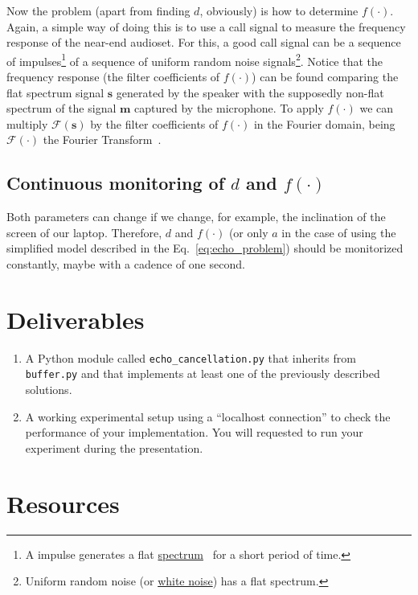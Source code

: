 Now the problem (apart from finding $d$, obviously) is how to
determine $f(\cdot)$. Again, a simple way of doing this is to use a
call signal to measure the frequency response of the near-end
audioset. For this, a good call signal can be a sequence of
impulses\footnote{A impulse generates a flat
  \href{https://en.wikipedia.org/wiki/Spectral_density}{spectrum}~\cite{kovacevic2013fourier,Oppenheim2}
  for a short period of time.} of a sequence of uniform random noise
signals\footnote{Uniform random noise (or
  \href{https://en.wikipedia.org/wiki/White_noise}{white noise}) has a
  flat spectrum.}. Notice that the frequency response (the filter
coefficients of $f(\cdot)$) can be found comparing the flat spectrum
signal ${\mathbf s}$ generated by the speaker with the supposedly
non-flat spectrum of the signal ${\mathbf m}$ captured by the
microphone. To apply $f(\cdot)$ we can multiply
${\mathcal F}({\mathbf s})$ by the filter coefficients of $f(\cdot)$
in the Fourier domain, being ${\mathcal F}(\cdot)$ the Fourier
Transform~\cite{kovacevic2013fourier,Oppenheim2}.

\subsection{Continuous monitoring of $d$ and $f(\cdot)$}
Both parameters can change if we change, for example, the inclination
of the screen of our laptop. Therefore, $d$ and $f(\cdot)$ (or only
$a$ in the case of using the simplified model described in the
Eq.~\eqref{eq:echo_problem}) should be monitorized constantly, maybe
with a cadence of one second.

\section{Deliverables}
\begin{enumerate}
\item A Python module called \texttt{echo\_cancellation.py} that
  inherits from \texttt{buffer.py} and that implements at least one of
  the previously described solutions.
\item A working experimental setup using a ``localhost connection'' to
  check the performance of your implementation. You will requested to
  run your experiment during the presentation.
\end{enumerate}
\section{Resources}



\begin{comment}
http://www.seas.ucla.edu/dsplab/index.html
https://es.mathworks.com/help/signal/ug/echo-cancelation.html
https://dsp.stackexchange.com/questions/26617/echo-cancelling-using-autocorrelation-function
https://pypi.org/project/adaptfilt/
http://www.diva-portal.org/smash/get/diva2:280596/fulltext01
https://github.com/ThomasHaubner/e2e_dnn_ad_control_for_lin_aec
https://scicoding.com/4-ways-of-calculating-autocorrelation-in-python/
\end{comment}